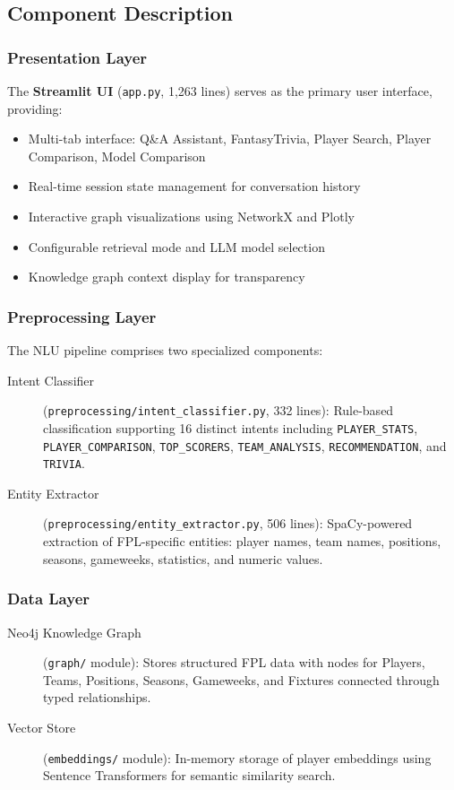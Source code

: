 \documentclass[11pt, a4paper]{article}
\begin{document}
\subsection{Component Description}

\subsubsection{Presentation Layer}
The \textbf{Streamlit UI} (\texttt{app.py}, 1,263 lines) serves as the primary user interface, providing:
\begin{itemize}
    \item Multi-tab interface: Q\&A Assistant, FantasyTrivia, Player Search, Player Comparison, Model Comparison
    \item Real-time session state management for conversation history
    \item Interactive graph visualizations using NetworkX and Plotly
    \item Configurable retrieval mode and LLM model selection
    \item Knowledge graph context display for transparency
\end{itemize}

\subsubsection{Preprocessing Layer}
The NLU pipeline comprises two specialized components:

\begin{description}
    \item[Intent Classifier] (\texttt{preprocessing/intent\_classifier.py}, 332 lines): Rule-based classification supporting 16 distinct intents including \texttt{PLAYER\_STATS}, \texttt{PLAYER\_COMPARISON}, \texttt{TOP\_SCORERS}, \texttt{TEAM\_ANALYSIS}, \texttt{RECOMMENDATION}, and \texttt{TRIVIA}.
    
    \item[Entity Extractor] (\texttt{preprocessing/entity\_extractor.py}, 506 lines): SpaCy-powered extraction of FPL-specific entities: player names, team names, positions, seasons, gameweeks, statistics, and numeric values.
\end{description}

\subsubsection{Data Layer}
\begin{description}
    \item[Neo4j Knowledge Graph] (\texttt{graph/} module): Stores structured FPL data with nodes for Players, Teams, Positions, Seasons, Gameweeks, and Fixtures connected through typed relationships.
    
    \item[Vector Store] (\texttt{embeddings/} module): In-memory storage of player embeddings using Sentence Transformers for semantic similarity search.
\end{description}
\end{document}
